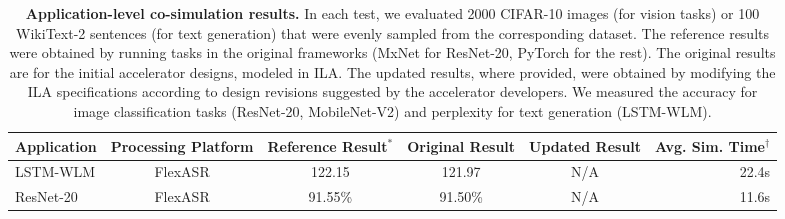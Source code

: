 \begin{table*}
  \caption{
  \textbf{Application-level co-simulation results.}
  In each test, we evaluated 2000 CIFAR-10 images (for vision tasks) or 100 WikiText-2 sentences (for text generation) that were evenly sampled from the corresponding dataset.
  The reference results were obtained by running tasks in the original frameworks (MxNet for ResNet-20, PyTorch for the rest).
  The original results are %
  for the initial accelerator designs, modeled in ILA.
  The updated results, where provided, were obtained by modifying the ILA specifications
  according to %
  design revisions suggested by the accelerator developers.
  We measured the accuracy for image classification tasks (ResNet-20, MobileNet-V2) and perplexity for text generation (LSTM-WLM).}
  \label{tab.verif-sim}
  \centering
  \begin{small}
  \begin{tabular}{|l|c|c|c|c|r|}
  \hline
  \multicolumn{1}{|c|}{Application} &
    \multicolumn{1}{c|}{Processing Platform} &
    \multicolumn{1}{c|}{Reference Result$^\ast$} &
    \multicolumn{1}{c|}{Original Result} &
    \multicolumn{1}{c|}{Updated Result} &
    \multicolumn{1}{c|}{Avg. Sim. Time$^\dagger$} \\
    \hline \hline

  LSTM-WLM & 
    FlexASR & 
    122.15 & 
    121.97 & 
    N/A &
    22.4s \\
    \hline


  ResNet-20 & 
    FlexASR &
    91.55\% &
    91.50\% &
    N/A &
    11.6s \\
    

\end{tabular}
\end{small}
\end{table*}
